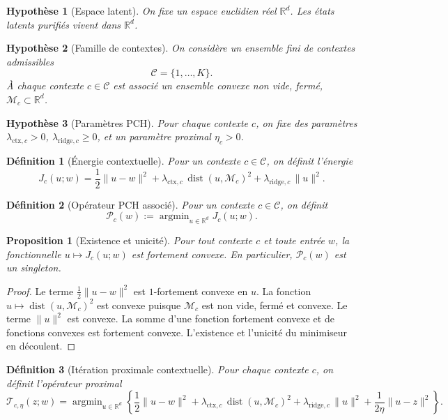 \documentclass[11pt,a4paper]{article}
\newtheorem{definition}{Définition}[section]
\newtheorem{assumption}{Hypothèse}[section]
\newtheorem{proposition}{Proposition}[section]
\DeclareMathOperator{\argmin}{argmin}
\DeclareMathOperator{\dist}{dist}
\newcommand{\R}{\mathbb R}
\newcommand{\Mcal}{\mathcal M}
\newcommand{\Ccal}{\mathcal C}
\newcommand{\Pcal}{\mathcal P}
\newcommand{\Tcal}{\mathcal T}
\begin{document}
\begin{assumption}[Espace latent]
On fixe un espace euclidien réel \(\R^d\). Les états latents purifiés vivent dans \(\R^d\).
\end{assumption}

\begin{assumption}[Famille de contextes]
On considère un ensemble fini de contextes admissibles
\[
\Ccal = \{1,\dots,K\}.
\]
À chaque contexte \(c\in\Ccal\) est associé un ensemble convexe non vide, fermé, \(\Mcal_c\subset\R^d\).
\end{assumption}

\begin{assumption}[Paramètres PCH]
Pour chaque contexte \(c\), on fixe des paramètres \(\lambda_{\mathrm{ctx},c}>0\), \(\lambda_{\mathrm{ridge},c}\ge 0\), et un paramètre proximal \(\eta_c>0\).
\end{assumption}

\begin{definition}[Énergie contextuelle]
Pour un contexte \(c\in\Ccal\), on définit l'énergie
\[
J_c(u;w)
=
\frac12\|u-w\|^2
+
\lambda_{\mathrm{ctx},c}\,\dist(u,\Mcal_c)^2
+
\lambda_{\mathrm{ridge},c}\,\|u\|^2.
\]
\end{definition}

\begin{definition}[Opérateur PCH associé]
Pour un contexte \(c\in\Ccal\), on définit
\[
\Pcal_c(w)
:=
\argmin_{u\in\R^d} J_c(u;w).
\]
\end{definition}

\begin{proposition}[Existence et unicité]
Pour tout contexte \(c\) et toute entrée \(w\), la fonctionnelle \(u\mapsto J_c(u;w)\) est fortement convexe. En particulier, \(\Pcal_c(w)\) est un singleton.
\end{proposition}

\begin{proof}
Le terme \(\frac12\|u-w\|^2\) est \(1\)-fortement convexe en \(u\). La fonction \(u\mapsto \dist(u,\Mcal_c)^2\) est convexe puisque \(\Mcal_c\) est non vide, fermé et convexe. Le terme \(\|u\|^2\) est convexe. La somme d'une fonction fortement convexe et de fonctions convexes est fortement convexe. L'existence et l'unicité du minimiseur en découlent.
\end{proof}

\begin{definition}[Itération proximale contextuelle]
Pour chaque contexte \(c\), on définit l'opérateur proximal
\[
\Tcal_{c,\eta}(z;w)
=
\argmin_{u\in\R^d}
\left\{
\frac12\|u-w\|^2
+
\lambda_{\mathrm{ctx},c}\,\dist(u,\Mcal_c)^2
+
\lambda_{\mathrm{ridge},c}\,\|u\|^2
+
\frac{1}{2\eta}\|u-z\|^2
\right\}.
\]
\end{definition}
\end{document}
